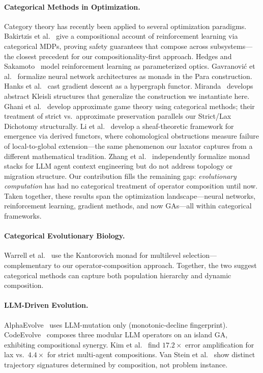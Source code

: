 \documentclass[sigconf]{acmart}
\begin{document}
\paragraph{Categorical Methods in Optimization.}
Category theory has recently been applied to several optimization paradigms.
Bakirtzis et al.~\cite{bakirtzis2024compositional} give a compositional account of reinforcement learning via categorical MDPs, proving safety guarantees that compose across subsystems---the closest precedent for our compositionality-first approach.
Hedges and Sakamoto~\cite{hedges2024reinforcement} model reinforcement learning as parameterized optics.
Gavranovi\'{c} et al.~\cite{gavranovic2024categorical} formalize neural network architectures as monads in the Para construction.
Hanks et al.~\cite{hanks2024gradient} cast gradient descent as a hypergraph functor.
Miranda~\cite{miranda2024abstract} develops abstract Kleisli structures that generalize the construction we instantiate here.
Ghani et al.~\cite{ghani2025approximate} develop approximate game theory using categorical methods; their treatment of strict vs.\ approximate preservation parallels our Strict/Lax Dichotomy structurally.
Li et al.~\cite{li2023emergence} develop a sheaf-theoretic framework for emergence via derived functors, where cohomological obstructions measure failure of local-to-global extension---the same phenomenon our laxator captures from a different mathematical tradition.
Zhang et al.~\cite{zhang2025monadic} independently formalize monad stacks for LLM agent context engineering but do not address topology or migration structure.
Our contribution fills the remaining gap: \emph{evolutionary computation} has had no categorical treatment of operator composition until now. Taken together, these results span the optimization landscape---neural networks, reinforcement learning, gradient methods, and now GAs---all within categorical frameworks.

\paragraph{Categorical Evolutionary Biology.}
Warrell et al.~\cite{warrell2024kantorovich} use the Kantorovich monad for multilevel selection---complementary to our operator-composition approach. Together, the two suggest categorical methods can capture both population hierarchy and dynamic composition.

\paragraph{LLM-Driven Evolution.}
AlphaEvolve~\cite{alphaevolve2026marl} uses LLM-mutation only (monotonic-decline fingerprint). CodeEvolve~\cite{assumpcao2025codeevolve} composes three modular LLM operators on an island GA, exhibiting compositional synergy. Kim et al.~\cite{kim2025scaling} find $17.2\times$ error amplification for lax vs.\ $4.4\times$ for strict multi-agent compositions. Van Stein et al.~\cite{vanstein2025code} show distinct trajectory signatures determined by composition, not problem instance.
\end{document}

